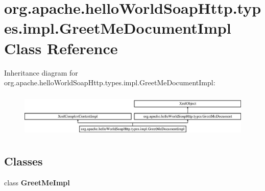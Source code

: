 \hypertarget{classorg_1_1apache_1_1hello_world_soap_http_1_1types_1_1impl_1_1_greet_me_document_impl}{}\section{org.\+apache.\+hello\+World\+Soap\+Http.\+types.\+impl.\+Greet\+Me\+Document\+Impl Class Reference}
\label{classorg_1_1apache_1_1hello_world_soap_http_1_1types_1_1impl_1_1_greet_me_document_impl}
Inheritance diagram for org.\+apache.\+hello\+World\+Soap\+Http.\+types.\+impl.\+Greet\+Me\+Document\+Impl\+:\begin{figure}[H]
\begin{center}
\leavevmode
\includegraphics[height=2.148338cm]{classorg_1_1apache_1_1hello_world_soap_http_1_1types_1_1impl_1_1_greet_me_document_impl}
\end{center}
\end{figure}
\subsection*{Classes}
\begin{DoxyCompactItemize}
\item 
class {\bfseries Greet\+Me\+Impl}
\end{DoxyCompactItemize}
